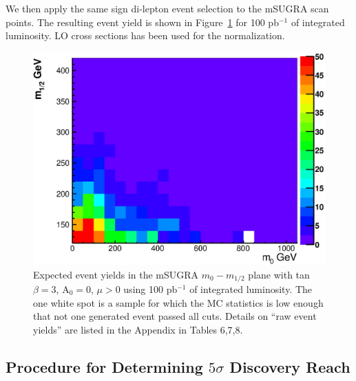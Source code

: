We then apply the same sign di-lepton event selection to the mSUGRA scan points. The resulting
event yield is shown in Figure~\ref{fig:ss_eventyield} for 100 pb$^{-1}$ of integrated luminosity.
LO cross sections has been used for the normalization. 

\vspace{3 mm}
\begin{figure}[htb]
\begin{center}
\includegraphics[width=0.7\linewidth]{figs/eventyieldss.eps}
\caption{Expected event yields in the mSUGRA $m_{0}-m_{1/2}$ plane with tan$\beta = 3$, A$_0 = 0$, $\mu > 0$
using 100 pb$^{-1}$ of integrated luminosity. The one white spot is a sample for which the MC statistics is low enough that not one generated event passed all cuts. Details on ``raw event yields'' are listed in the Appendix in Tables 6,7,8. \label{fig:ss_eventyield}}
\end{center}
\end{figure}


\subsection{Procedure for Determining $5\sigma$ Discovery Reach}
\label{sec:significance}

